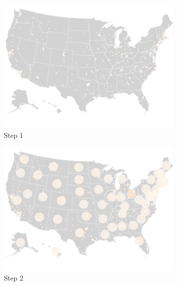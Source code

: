 \begin{figure}
    \centering

    \begin{subfigure}[b]{0.31\textwidth}
        \centering
        \includegraphics[width=\textwidth]{images/results/dot_cartogram/transition_1.png}
        \caption[]%
        {{\small Step 1}}
    \end{subfigure}
    \hfill
    \begin{subfigure}[b]{0.31\textwidth}
        \centering
        \includegraphics[width=\textwidth]{images/results/dot_cartogram/transition_2.png}
        \caption[]%
        {{\small Step 2}}
    \end{subfigure}
    \hfill
    \begin{subfigure}[b]{0.31\textwidth}

\end{subfigure}
\end{figure}
